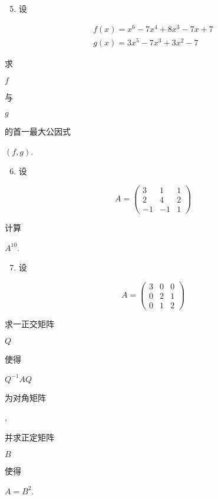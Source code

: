 \documentclass[10pt]{article}
\begin{document}
\begin{enumerate}
  \setcounter{enumi}{4}
  \item \begin{CJK}{UTF8}{mj}设\end{CJK}
\end{enumerate}
$$
\begin{gathered}
f(x)=x^{6}-7 x^{4}+8 x^{3}-7 x+7 \\
g(x)=3 x^{5}-7 x^{3}+3 x^{2}-7
\end{gathered}
$$
\begin{CJK}{UTF8}{mj}求\end{CJK} $f$ \begin{CJK}{UTF8}{mj}与\end{CJK} $g$ \begin{CJK}{UTF8}{mj}的首一最大公因式\end{CJK} $(f, g)$.

\begin{enumerate}
  \setcounter{enumi}{5}
  \item \begin{CJK}{UTF8}{mj}设\end{CJK}
\end{enumerate}
$$
A=\left(\begin{array}{ccc}
3 & 1 & 1 \\
2 & 4 & 2 \\
-1 & -1 & 1
\end{array}\right)
$$
\begin{CJK}{UTF8}{mj}计算\end{CJK} $A^{10}$.

\begin{enumerate}
  \setcounter{enumi}{6}
  \item \begin{CJK}{UTF8}{mj}设\end{CJK}
\end{enumerate}
$$
A=\left(\begin{array}{lll}
3 & 0 & 0 \\
0 & 2 & 1 \\
0 & 1 & 2
\end{array}\right)
$$
\begin{CJK}{UTF8}{mj}求一正交矩阵\end{CJK} $Q$ \begin{CJK}{UTF8}{mj}使得\end{CJK} $Q^{-1} A Q$ \begin{CJK}{UTF8}{mj}为对角矩阵\end{CJK}, \begin{CJK}{UTF8}{mj}并求正定矩阵\end{CJK} $B$ \begin{CJK}{UTF8}{mj}使得\end{CJK} $A=B^{2}$.
\end{document}
